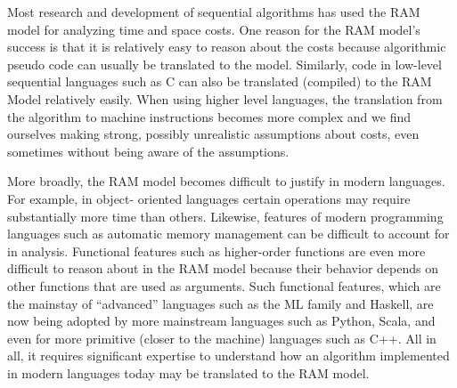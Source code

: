 \begin{cluster}
\label{grp:grm:analysis::models::critique-of-the-ram-model}

\begin{gram}
\label{grm:analysis::models::critique-of-the-ram-model}
Most research and development of sequential algorithms has used the RAM model for
analyzing time and space costs.
One reason for the RAM model's success is that it is relatively easy
to reason about the costs because algorithmic pseudo code can usually
be translated to the model.
Similarly, code in low-level sequential languages such as C can also
be translated (compiled) to the RAM Model relatively easily.
When using higher level languages, the translation from the algorithm to
machine instructions becomes more complex and we find ourselves making
strong, possibly unrealistic assumptions about costs, even sometimes
without being aware of the assumptions.  

More broadly, the RAM model becomes difficult to justify in modern
languages.
For example, in object- oriented languages certain operations may
require substantially more time than others.
Likewise, features of modern programming languages such as automatic
memory management can be difficult to account for in
analysis.
Functional features such as higher-order functions are even more
difficult to reason about in the RAM model because their behavior
depends on other functions that are used as arguments.
Such functional features, which are the mainstay of ``advanced''
languages such as the ML family and Haskell, are now being adopted by
more mainstream languages such as Python, Scala, and even for more primitive (closer to the machine)
languages such as C++.
All in all, it requires significant expertise to understand how an
algorithm implemented in modern languages today may be translated to the
RAM model.

\end{gram}
\end{cluster}

